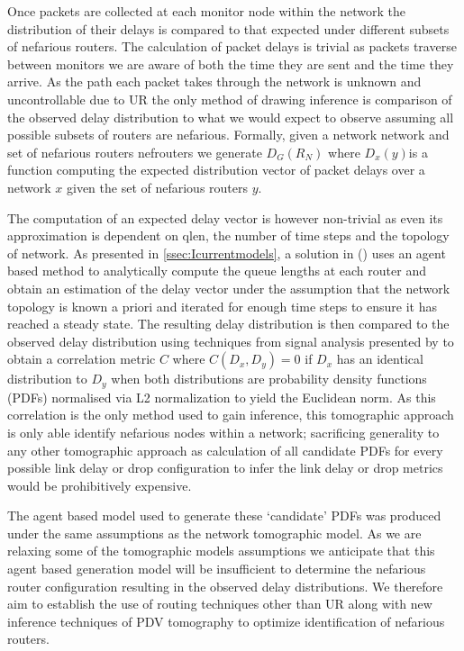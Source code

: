 Once packets are collected at each monitor node within the network the distribution of their delays is compared to that expected under different subsets of nefarious routers. The calculation of packet delays is trivial as packets traverse between monitors we are aware of both the time they are sent and the time they arrive. As the path each packet takes through the network is unknown and uncontrollable due to UR the only method of drawing inference is comparison of the observed delay distribution to what we would expect to observe assuming all possible subsets of routers are nefarious. Formally, given a network \gls{network} and set of nefarious routers \gls{nefrouters} we generate $D_G(R_N)$ where $D_x(y)$is a function computing the expected distribution vector of packet delays over a network $x$ given the set of nefarious routers $y$.\par
The computation of an expected delay vector is however non-trivial as even its approximation is dependent on \gls{qlen}, the number of time steps and the topology of \gls{network}. As presented in \cref{ssec:Icurrentmodels}, a solution in (\cite{barnes_stochastic_2020}) uses an agent based method to analytically compute the queue lengths at each router and obtain an estimation of the delay vector under the assumption that the network topology is known a priori and iterated for enough time steps to ensure it has reached a steady state. The resulting delay distribution is then compared to the observed delay distribution using techniques from signal analysis presented by \cite{lynn_introduction_2016} to obtain a correlation metric $C$ where $C(D_x,D_y)=0$ if $D_x$ has an identical distribution to $D_y$ when both distributions are probability density functions (PDFs) normalised via L2 normalization to yield the Euclidean norm. As this correlation is the only method used to gain inference, this tomographic approach is only able identify nefarious nodes within a network; sacrificing generality to any other tomographic approach as calculation of all candidate PDFs for every possible link delay or drop configuration to infer the link delay or drop metrics would be prohibitively expensive.\par
The agent based model used to generate these ‘candidate’ PDFs was produced under the same assumptions as the network tomographic model. As we are relaxing some of the tomographic models assumptions we anticipate that this agent based generation model will be insufficient to determine the nefarious router configuration resulting in the observed delay distributions. We therefore aim to establish the use of routing techniques other than UR along with new inference techniques of PDV tomography to optimize identification of nefarious routers.

